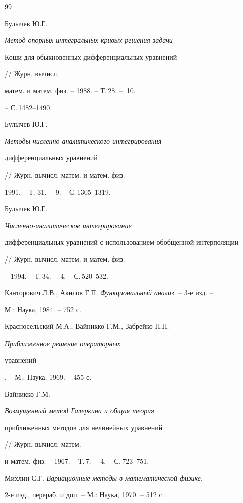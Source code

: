 \begin{thebibliography}{99}







Булычев Ю.Г. {\em Метод опорных интегральных кривых решения задачи


Коши для обыкновенных дифференциальных уравнений} // Журн. вычисл.


матем. и матем. физ. -- 1988. -- Т.\,28. -- \No\,10.


-- С.\,1482--1490.




Булычев Ю.Г. {\em Методы численно-аналитического интегрирования


дифференциальных уравнений} // Журн. вычисл. матем. и матем. физ. --


1991. -- Т. 31. -- \No\,9. -- С.\,1305--1319.




Булычев Ю.Г. {\em Численно-аналитическое интегрирование


дифференциальных уравнений с использованием обобщенной интерполяции}


// Журн. вычисл. матем. и матем. физ.


-- 1994. -- Т.\,34. -- \No\,4. -- С.\,520--532.




Канторович Л.В., Акилов Г.П. {\em Функциональный анализ}. -- 3-е изд. --


М.: Наука, 1984. -- 752 с.




Красносельский М.А., Вайникко Г.М., Забрейко П.П.


{\em Приближенное решение операторных


уравнений}. -- М.: Наука, 1969. -- 455 с.




Вайникко Г.М. {\em Возмущенный метод Галеркина и общая теория


приближенных методов для нелинейных уравнений} // Журн. вычисл. матем.


и матем. физ. -- 1967. -- Т.\,7. -- \No\,4. -- С.\,723--751.




Михлин С.Г. {\em Вариационные методы в математической физике}. --


2-е изд., перераб. и доп. -- М.: Наука, 1970. -- 512 с.





\end{thebibliography}
